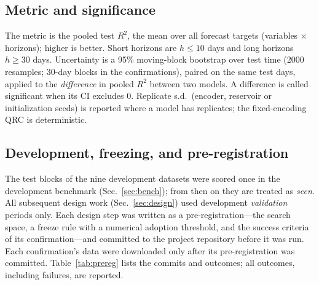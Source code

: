 \documentclass[aps,prresearch,preprint,superscriptaddress,amsmath,amssymb,floatfix]{revtex4-2}
\begin{document}
\subsection{Metric and significance}
The metric is the pooled test $R^2$, the mean over all forecast targets
(variables $\times$ horizons); higher is better. Short horizons are $h\le10$ days and
long horizons $h\ge30$ days. Uncertainty is a 95\% moving-block bootstrap over test
time (2000 resamples; 30-day blocks in the confirmations), paired on the same test
days, applied to the \emph{difference} in pooled $R^2$ between two models. A
difference is called significant when its CI excludes 0. Replicate s.d.\ (encoder,
reservoir or initialization seeds) is reported where a model has replicates; the
fixed-encoding QRC is deterministic.

\subsection{Development, freezing, and pre-registration}
The test blocks of the nine development datasets were scored once in the development
benchmark (Sec.~\ref{sec:bench}); from then on they are treated as \emph{seen}. All
subsequent design work (Sec.~\ref{sec:design}) used development \emph{validation}
periods only. Each design step was written as a pre-registration---the search space,
a freeze rule with a numerical adoption threshold, and the success criteria of its
confirmation---and committed to the project repository before it was run. Each
confirmation's data were downloaded only after its pre-registration was committed.
Table~\ref{tab:prereg} lists the commits and outcomes; all outcomes, including
failures, are reported.
\end{document}
